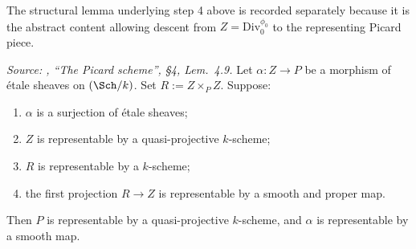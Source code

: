 The structural lemma underlying step 4 above is recorded separately
because it is the abstract content allowing descent from
\(Z = \mathrm{Div}^{\phi_0}_0\) to the representing Picard piece.

\begin{lemma}
  \label{lem:smooth_proper_quotient}
  \textit{Source: \cite{kleiman-picard}, ``The Picard scheme'', \S 4, Lem.~4.9.}
  Let \(\alpha : Z \to P\) be a morphism of \'etale sheaves on \((\Sch/k)\).
  Set \(R := Z \times_P Z\). Suppose:
  \begin{enumerate}
    \item \(\alpha\) is a surjection of \'etale sheaves;
    \item \(Z\) is representable by a quasi-projective \(k\)-scheme;
    \item \(R\) is representable by a \(k\)-scheme;
    \item the first projection \(R \to Z\) is representable by a smooth
      and proper map.
  \end{enumerate}
  Then \(P\) is representable by a quasi-projective \(k\)-scheme, and \(\alpha\)
  is representable by a smooth map.
\end{lemma}


